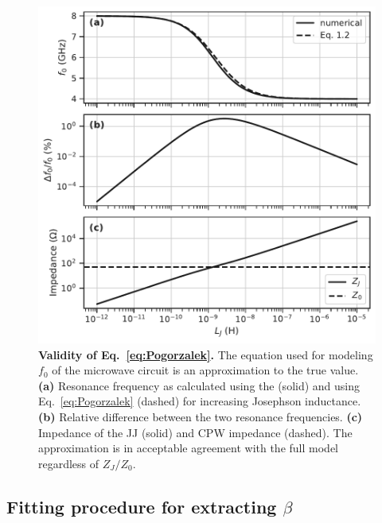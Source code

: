 \begin{figure}
	\centering
	\includegraphics[width=0.5\linewidth]{chapter-gJJ-CPR/figs/SMFigure-validity}
	\caption{
		\textbf{Validity of Eq.~\ref{eq:Pogorzalek}.}
		The equation used for modeling $f_0$ of the microwave circuit is an approximation to the true value.
		\textbf{(a)} Resonance frequency as calculated using the  (solid) and using Eq.~\ref{eq:Pogorzalek} (dashed) for increasing Josephson inductance.
		\textbf{(b)} Relative difference between the two resonance frequencies.
		\textbf{(c)} Impedance of the JJ (solid) and CPW impedance (dashed).
		The approximation is in acceptable agreement with the full model regardless of $Z_J/Z_0$.
	}
	\label{fig:SMval}
\end{figure}


\subsection{Fitting procedure for extracting $\beta$}

